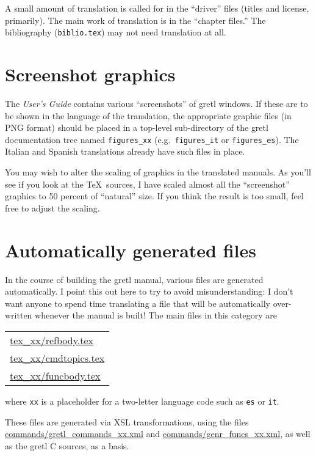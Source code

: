 \documentclass{article}
\begin{document}
A small amount of translation is called for in the ``driver'' files
(titles and license, primarily).  The main work of translation is in
the ``chapter files.''  The bibliography (\texttt{biblio.tex}) may not
need translation at all.

\section{Screenshot graphics}

The \textit{User's Guide} contains various ``screenshots'' of
\textsf{gretl} windows.  If these are to be shown in the language of
the translation, the appropriate graphic files (in \textsf{PNG}
format) should be placed in a top-level sub-directory of the
\textsf{gretl} documentation tree named \texttt{figures\_xx} (e.g.\ 
\texttt{figures\_it} or \texttt{figures\_es}).  The Italian and
Spanish translations already have such files in place.

You may wish to alter the scaling of graphics in the translated
manuals.  As you'll see if you look at the \TeX\ sources, I have
scaled almost all the ``screenshot'' graphics to 50 percent of
``natural'' size.  If you think the result is too small, feel free to
adjust the scaling.


\section{Automatically generated files}

In the course of building the gretl manual, various files are
generated automatically.  I point this out here to try to avoid
misunderstanding: I don't want anyone to spend time translating a
file that will be automatically over-written whenever the manual is
built!  The main files in this category are

\begin{center}
\begin{tabular}{l}
\url{tex_xx/refbody.tex}\\
\url{tex_xx/cmdtopics.tex}\\
\url{tex_xx/funcbody.tex}\\
\end{tabular}
\end{center}

\noindent
where \texttt{xx} is a placeholder for a two-letter language code
such as \texttt{es} or \texttt{it}.  

These files are generated via XSL transformations, using the files
\url{commands/gretl_commands_xx.xml} and
\url{commands/genr_funcs_xx.xml}, as well as the \textsf{gretl} C
sources, as a basis.
\end{document}
